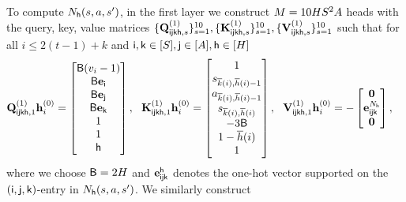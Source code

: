 To compute ${N}_{\mathsf{h}}({s},{a},{s}')$, in the first layer we construct ${M}=10{H}{S}^2{A}$ heads with the query, key, value matrices $\{{\mathbf Q}^{(1)}_{{\mathsf{i}}{\mathsf{j}}{\mathsf{k}}{\mathsf{h}},s}\}_{s=1}^{10},\{{\mathbf K}^{(1)}_{{\mathsf{i}}{\mathsf{j}}{\mathsf{k}}{\mathsf{h}},s}\}_{s=1}^{10},\{{\mathbf V}^{(1)}_{{\mathsf{i}}{\mathsf{j}}{\mathsf{k}}{\mathsf{h}},s}\}_{s=1}^{10}$  such that for all $i\leq 2(t-1)+k$ and ${\mathsf{i}},{\mathsf{k}}\in[{S}],{\mathsf{j}}\in[{A}],{\mathsf{h}}\in[{H}]$
\begin{align*}
&{\mathbf Q}^{(1)}_{{\mathsf{i}}{\mathsf{j}}{\mathsf{k}}{\mathsf{h}},1}{\mathbf h}^{(0)}_{i}=
\begin{bmatrix}
{\mathsf{B}}({v}_i-1)\\
        {\mathsf{B}}{\mathbf e}_{\mathsf{i}}\\
         {\mathsf{B}}{\mathbf e}_{\mathsf{j}}\\
          {\mathsf{B}}{\mathbf e}_{\mathsf{k}}\\
          1\\
          1\\
         {\mathsf{h}}
    \end{bmatrix},~~ {\mathbf K}^{(1)}_{{\mathsf{i}}{\mathsf{j}}{\mathsf{k}}{\mathsf{h}},1}{\mathbf h}^{(0)}_{i}=\begin{bmatrix}1\\
     {s}_{\overline{k}(i),\overline{h}(i)-1}\\
        {a}_{\overline{k}(i),\overline{h}(i)-1}\\
         {s}_{\overline{k}(i),\overline{h}(i)}\\
        -3{\mathsf{B}}\\
        1- \overline{h}(i)\\
        1
\end{bmatrix},~~ {\mathbf V}^{(1)}_{{\mathsf{i}}{\mathsf{j}}{\mathsf{k}}{\mathsf{h}},1}{\mathbf h}^{(0)}_{i}=-
\begin{bmatrix}
{\mathbf 0}\\{\mathbf e}^{{N}_{\mathsf{h}}}_{{\mathsf{i}}{\mathsf{j}}{\mathsf{k}}}
\\{\mathbf 0}\end{bmatrix},
\end{align*}
where we choose ${\mathsf{B}}=2{H}$ and ${\mathbf e}_{{\mathsf{i}}{\mathsf{j}}{\mathsf{k}}}^{\mathsf{h}}$ denotes the one-hot vector supported on the $({\mathsf{i}},{\mathsf{j}},{\mathsf{k}})$-entry in ${N}_{\mathsf{h}}({s},{a},{s}')$.
We similarly construct 
